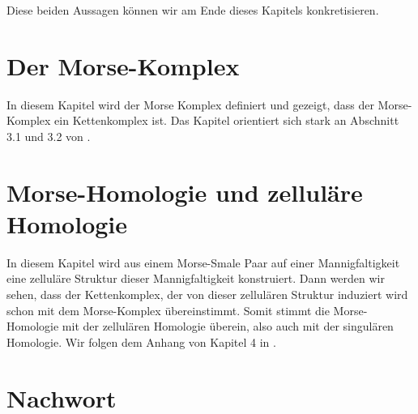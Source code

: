 \documentclass[a4paper,11pt,twoside]{scrreport}
\begin{document}
Diese beiden Aussagen können wir am Ende dieses Kapitels konkretisieren.







\begingroup
\let\clearpage\relax
\chapter{Der Morse-Komplex}
\endgroup

In diesem Kapitel wird der Morse Komplex definiert und gezeigt, dass der 
Morse-Komplex ein Kettenkomplex ist. Das Kapitel orientiert sich stark an Abschnitt 3.1 und 3.2 von 
\cite{audin}.




\begingroup
\let\clearpage\relax
\chapter{Morse-Homologie und zelluläre Homologie}
\endgroup

In diesem Kapitel wird aus einem Morse-Smale Paar auf einer Mannigfaltigkeit
eine zelluläre Struktur dieser Mannigfaltigkeit konstruiert. Dann werden wir 
sehen, dass der Kettenkomplex, der von dieser zellulären Struktur induziert wird schon mit
dem Morse-Komplex übereinstimmt. Somit stimmt die Morse-Homologie mit der 
zellulären Homologie überein, also auch mit der singulären Homologie.
Wir folgen dem Anhang von Kapitel 4 in \cite{audin}.






\begingroup
\let\clearpage\relax
\chapter{Nachwort}
\endgroup
\end{document}
